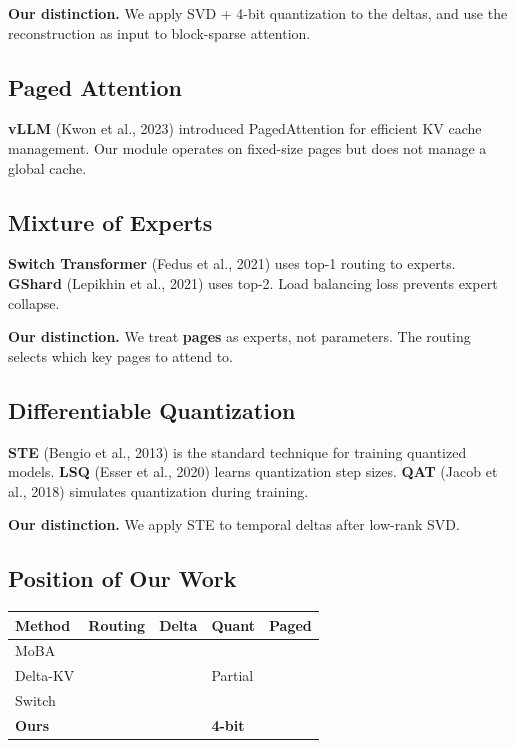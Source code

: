 \textbf{Our distinction.} We apply SVD + 4-bit quantization to the deltas, and 
use the reconstruction as input to block-sparse attention.

\subsection{Paged Attention}

\textbf{vLLM} (Kwon et al., 2023) introduced PagedAttention for efficient KV cache 
management. Our module operates on fixed-size pages but does not manage a 
global cache.

\subsection{Mixture of Experts}

\textbf{Switch Transformer} (Fedus et al., 2021) uses top-1 routing to experts. 
\textbf{GShard} (Lepikhin et al., 2021) uses top-2. Load balancing loss prevents 
expert collapse.

\textbf{Our distinction.} We treat \textbf{pages} as experts, not parameters. The 
routing selects which key pages to attend to.

\subsection{Differentiable Quantization}

\textbf{STE} (Bengio et al., 2013) is the standard technique for training 
quantized models. \textbf{LSQ} (Esser et al., 2020) learns quantization step 
sizes. \textbf{QAT} (Jacob et al., 2018) simulates quantization during training.

\textbf{Our distinction.} We apply STE to temporal deltas after low-rank SVD.

\subsection{Position of Our Work}

\begin{table}[H]
\centering
\small
\begin{tabular}{lllll}
\toprule
\textbf{Method} & \textbf{Routing} & \textbf{Delta} & \textbf{Quant} & \textbf{Paged} \\
\midrule
MoBA &  &  &  &  \\
Delta-KV &  &  & Partial &  \\
Switch &  &  &  &  \\
\textbf{Ours} & \textbf{ } & \textbf{ } & \textbf{4-bit} & \textbf{ } \\
\bottomrule
\end{tabular}
\end{table}

